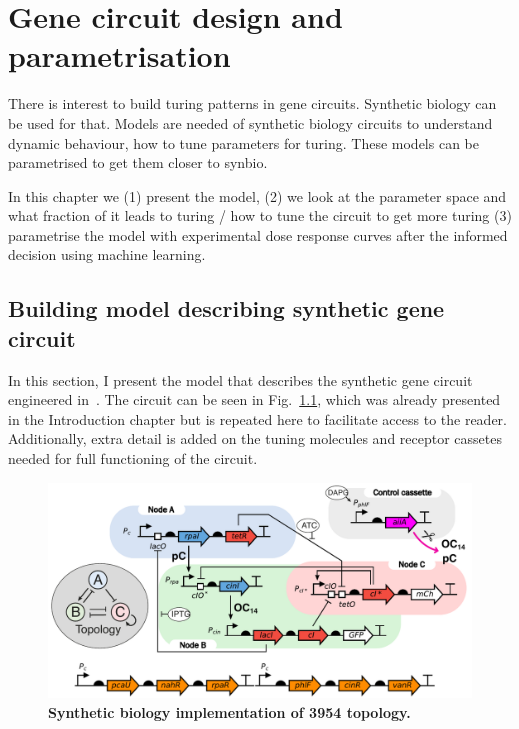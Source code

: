 
\chapter{Gene circuit design and parametrisation}
There is interest to build turing patterns in gene circuits. Synthetic biology can be used for that. Models are needed of synthetic biology circuits to understand dynamic behaviour, how to tune parameters for turing. These models can be parametrised to get them closer to synbio.

In this chapter we (1) present the model, (2) we look at the parameter space and what fraction of it leads to turing / how to tune the circuit to get more turing (3) parametrise the model with experimental dose response curves after the informed decision using machine learning.
\section{Building model describing synthetic gene circuit}
In this section, I present the model that describes the synthetic gene circuit engineered in~\cite{Tica2020}.
The circuit can be seen in Fig.~\ref{fig:synthetic circuit_chapter2}, which was already presented in the Introduction chapter but is repeated here to facilitate access to the reader.
Additionally, extra detail is added on the tuning molecules and receptor cassetes needed for full functioning of the circuit.

\begin{figure}[H]
    \centering
    \includegraphics[width=1\textwidth]{chapters/Chapter 2/synthetic circuit2}
    \caption[\textbf{Synthetic biology implementation of 3954) topology.}]{\textbf{Synthetic biology implementation of 3954 topology.} } %
    \label{fig:synthetic circuit_chapter2}
\end{figure}


